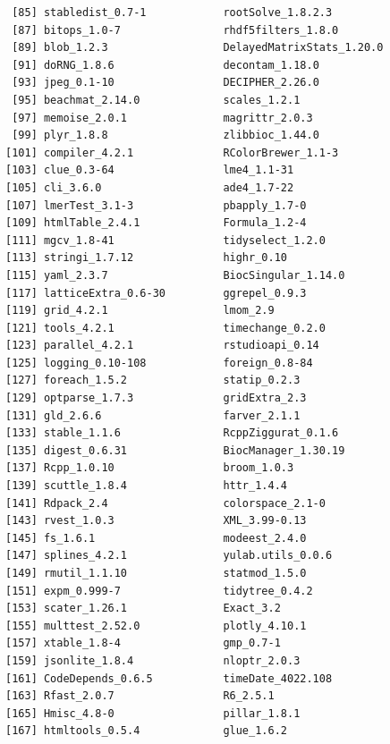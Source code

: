 \documentclass[
]{book}
\begin{document}
\begin{verbatim}
 [85] stabledist_0.7-1            rootSolve_1.8.2.3          
 [87] bitops_1.0-7                rhdf5filters_1.8.0         
 [89] blob_1.2.3                  DelayedMatrixStats_1.20.0  
 [91] doRNG_1.8.6                 decontam_1.18.0            
 [93] jpeg_0.1-10                 DECIPHER_2.26.0            
 [95] beachmat_2.14.0             scales_1.2.1               
 [97] memoise_2.0.1               magrittr_2.0.3             
 [99] plyr_1.8.8                  zlibbioc_1.44.0            
[101] compiler_4.2.1              RColorBrewer_1.1-3         
[103] clue_0.3-64                 lme4_1.1-31                
[105] cli_3.6.0                   ade4_1.7-22                
[107] lmerTest_3.1-3              pbapply_1.7-0              
[109] htmlTable_2.4.1             Formula_1.2-4              
[111] mgcv_1.8-41                 tidyselect_1.2.0           
[113] stringi_1.7.12              highr_0.10                 
[115] yaml_2.3.7                  BiocSingular_1.14.0        
[117] latticeExtra_0.6-30         ggrepel_0.9.3              
[119] grid_4.2.1                  lmom_2.9                   
[121] tools_4.2.1                 timechange_0.2.0           
[123] parallel_4.2.1              rstudioapi_0.14            
[125] logging_0.10-108            foreign_0.8-84             
[127] foreach_1.5.2               statip_0.2.3               
[129] optparse_1.7.3              gridExtra_2.3              
[131] gld_2.6.6                   farver_2.1.1               
[133] stable_1.1.6                RcppZiggurat_0.1.6         
[135] digest_0.6.31               BiocManager_1.30.19        
[137] Rcpp_1.0.10                 broom_1.0.3                
[139] scuttle_1.8.4               httr_1.4.4                 
[141] Rdpack_2.4                  colorspace_2.1-0           
[143] rvest_1.0.3                 XML_3.99-0.13              
[145] fs_1.6.1                    modeest_2.4.0              
[147] splines_4.2.1               yulab.utils_0.0.6          
[149] rmutil_1.1.10               statmod_1.5.0              
[151] expm_0.999-7                tidytree_0.4.2             
[153] scater_1.26.1               Exact_3.2                  
[155] multtest_2.52.0             plotly_4.10.1              
[157] xtable_1.8-4                gmp_0.7-1                  
[159] jsonlite_1.8.4              nloptr_2.0.3               
[161] CodeDepends_0.6.5           timeDate_4022.108          
[163] Rfast_2.0.7                 R6_2.5.1                   
[165] Hmisc_4.8-0                 pillar_1.8.1               
[167] htmltools_0.5.4             glue_1.6.2                 

\end{verbatim}
\end{document}
